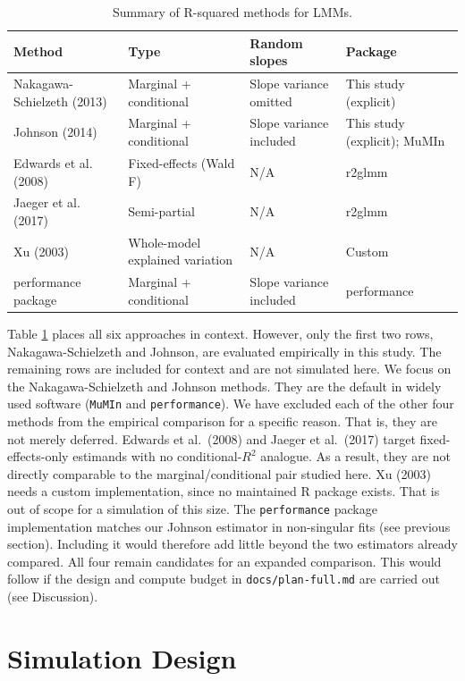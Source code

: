 \documentclass[
  11pt,
]{article}
\begin{document}
\begin{table}[!h]
\centering
\caption{\label{tab:methods-summary}Summary of R-squared methods for LMMs.}
\centering
\fontsize{10}{12}\selectfont
\begin{tabular}[t]{llll}
\toprule
Method & Type & Random slopes & Package\\
\midrule
Nakagawa-Schielzeth (2013) & Marginal + conditional & Slope variance omitted & This study (explicit)\\
Johnson (2014) & Marginal + conditional & Slope variance included & This study (explicit); MuMIn\\
Edwards et al. (2008) & Fixed-effects (Wald F) & N/A & r2glmm\\
Jaeger et al. (2017) & Semi-partial & N/A & r2glmm\\
Xu (2003) & Whole-model explained variation & N/A & Custom\\
\addlinespace
performance package & Marginal + conditional & Slope variance included & performance\\
\bottomrule
\end{tabular}
\end{table}

Table \ref{tab:methods-summary} places all six approaches in
context. However, only the first two rows, Nakagawa-Schielzeth
and Johnson, are evaluated empirically in this study. The
remaining rows are included for context and are not simulated
here. We focus on the Nakagawa-Schielzeth and Johnson methods.
They are the default in widely used software (\texttt{MuMIn} and
\texttt{performance}). We have excluded each of the other
four methods from the empirical comparison for a specific reason.
That is, they are not merely deferred. Edwards et al.~(2008) and
Jaeger et al.~(2017) target fixed-effects-only estimands with no
conditional-\(R^2\) analogue. As a result, they are not directly
comparable to the marginal/conditional pair studied here. Xu
(2003) needs a custom implementation, since no maintained R
package exists. That is out of scope for a simulation of this
size. The \texttt{performance} package implementation matches our
Johnson estimator in non-singular fits (see previous section).
Including it would therefore add little beyond the two estimators
already compared. All four remain candidates for an
expanded comparison. This would follow if the design and compute
budget in \texttt{docs/plan-full.md} are carried out (see Discussion).

\section{Simulation Design}\label{simulation-design}
\end{document}
